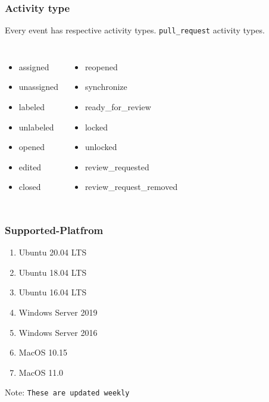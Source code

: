 \documentclass[gray]{beamer}
\begin{document}
\begin{frame}
  \frametitle{Activity type}
 \href{https://docs.github.com/en/free-pro-team@latest/actions/reference/events-that-trigger-workflows\#pull_request}{}

Every event has respective activity types. \texttt{pull\_request} activity types.

\begin{columns}
\begin{itemize}
\item assigned
\item unassigned
\item labeled
\item unlabeled
\item opened
\item edited
\item closed
\end{itemize}

\begin{itemize}
\item reopened
\item synchronize
\item ready\_for\_review
\item locked
\item unlocked
\item review\_requested
\item review\_request\_removed \end{itemize}
\end{columns}
\end{frame}

\begin{frame}
  \frametitle{Supported-Platfrom}

  \href{https://docs.github.com/en/free-pro-team@latest/actions/reference/specifications-for-github-hosted-runners\#supported-software}{}

 \begin{enumerate}
 \item Ubuntu 20.04 LTS
 \item Ubuntu 18.04 LTS
 \item Ubuntu 16.04 LTS
 \item Windows Server 2019
 \item Windows Server 2016
 \item MacOS 10.15
 \item MacOS 11.0
 \end{enumerate}

 \vspace{2cm}

 Note: \texttt{These are updated weekly}
\end{frame}
\end{document}

